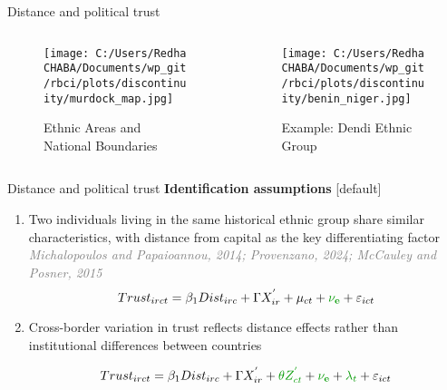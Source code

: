 \documentclass[aspectratio=169,xcolor=dvipsnames]{beamer}
\begin{document}
\begin{frame}[noframenumbering]{Distance and political trust}
    \begin{columns}
    \begin{column}{0.5\textwidth}
        \begin{figure}
    \centering
    \texttt{[image: C:/Users/Redha CHABA/Documents/wp\_git/rbci/plots/discontinuity/murdock\_map.jpg]}
    \caption{Ethnic Areas and National Boundaries}
\end{figure}
    \end{column}

    \begin{column}{0.5\textwidth}
        \begin{figure}
    \centering
    \texttt{[image: C:/Users/Redha CHABA/Documents/wp\_git/rbci/plots/discontinuity/benin\_niger.jpg]}
    \caption{Example: Dendi Ethnic Group}
\end{figure}

    \end{column}

\end{columns}
\end{frame}




\begin{frame}[noframenumbering]{Distance and political trust}
    \centering \textcolor[rgb]{0.0,0.6,0.0}{\textbf{Identification assumptions}}\vfill
    [default]
    \begin{enumerate}
        \item Two individuals living in the same historical ethnic group share similar characteristics, with distance from capital as the key differentiating factor \\ \vfill
        \textcolor{gray}{\textit{Michalopoulos and Papaioannou, 2014; Provenzano, 2024; McCauley and Posner, 2015}} \\ \vfill
        \begin{equation}
    Trust_{irct}=\beta_{1}Dist_{irc}+\Gamma X^{'}_{ir}+ \mu_{ct} + \textcolor[rgb]{0.0,0.6,0.0}{\mathbf{\nu_{e}}}+\varepsilon_{ict}
    \end{equation}\vfill
        \item Cross-border variation in trust reflects distance effects rather than institutional differences between countries
        
\begin{equation}
    Trust_{irct}=\beta_{1}Dist_{irc}+\Gamma X^{'}_{ir}+ \textcolor[rgb]{0.0,0.6,0.0}{\theta Z^{'}_{ct}} + \textcolor[rgb]{0.0,0.6,0.0}{\mathbf{\nu_{e}}}+\textcolor[rgb]{0.0,0.6,0.0}{\lambda_{t}}+\varepsilon_{ict}
    \end{equation}
            
    \end{enumerate}
\end{frame}
\end{document}
